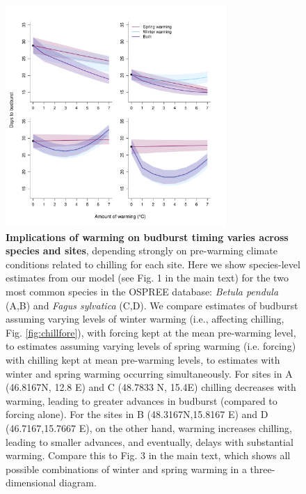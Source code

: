 \documentclass{article}
\begin{document}
\begin{figure}[h!]
\centering
\noindent \includegraphics[width=0.75\textwidth]{..//..//analyses/bb_analysis/figures/forecasting/tempforecastbothspp_1_7_degwarm.pdf}
\caption{\textbf{Implications of warming on budburst timing varies across species and sites}, depending strongly on pre-warming climate conditions related to chilling for each site. Here we show species-level estimates from our model (see Fig. 1 in the main text) for the two most common species in the OSPREE database: \emph{Betula pendula} (A,B) and \emph{Fagus sylvatica} (C,D). We compare estimates of budburst assuming varying levels of winter warming (i.e., affecting chilling, Fig. \ref{fig:chillfore}), with forcing kept at the mean pre-warming level, to estimates assuming varying levels of spring warming (i.e. forcing) with chilling kept at mean pre-warming levels, to estimates with winter and spring warming occurring simultaneously. For sites in A (46.8167\degree N, 12.8 \degree E) and C (48.7833 \degree N, 15.4\degree E) chilling decreases with warming, leading to greater advances in budburst (compared to forcing alone). For the sites in B (48.3167\degree N,15.8167 \degree E) and D (46.7167,15.7667 \degree E), on the other hand, warming increases chilling, leading to smaller advances, and eventually, delays with substantial warming.  Compare  this to Fig. 3 in the main text, which shows all possible combinations of winter and spring warming in a three-dimensional diagram.}
\label{fig:betpenfagsyl}
\end{figure}
\end{document}
